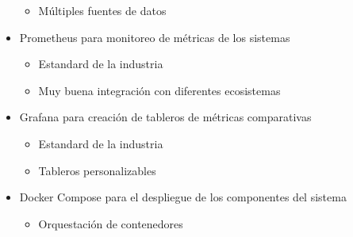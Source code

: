 \begin{itemize}
\begin{itemize}
           \item Múltiples fuentes de datos
       \end{itemize}
    \item Prometheus para monitoreo de métricas de los sistemas
       \begin{itemize}
           \item Estandard de la industria
           \item Muy buena integración con diferentes ecosistemas
       \end{itemize}
    \item Grafana para creación de tableros de métricas comparativas
       \begin{itemize}
            \item Estandard de la industria
            \item Tableros personalizables
       \end{itemize}
    \item Docker Compose para el despliegue de los componentes del sistema
       \begin{itemize}
           \item Orquestación de contenedores
       \end{itemize}
   \end{itemize}
\newpage